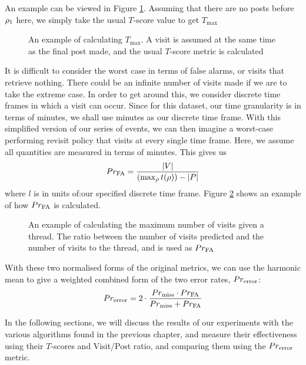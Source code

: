 An example can be viewed in Figure \ref{fig:norm_t_score}. Assuming that there 
are no posts before $\post_1$ here, we simply take the usual $T$-score value to 
get $T_\text{max}$
\begin{figure}
\begin{center}

	\end{center}
\caption{An example of calculating $T_\text{max}$. A visit is assumed at the 
same time as the final post made, and the usual $T$-score metric is 
calculated}\label{fig:norm_t_score}
\end{figure}
It is difficult to consider the worst case in terms of false alarms, or visits 
that retrieve nothing. There could be an infinite number of visits made if we 
are to take the extreme case. In order to get around this, we consider discrete 
time frames in which a visit can occur. Since for this dataset, our time 
granularity is in terms of minutes, we shall use minutes as our discrete time 
frame.
With this simplified version of our series of events, we can then imagine a 
worst-case performing revisit policy that visits at every single time frame.  
Here, we assume all quantities are measured in terms of minutes. This gives us
\[
	\P_{\text{FA}} = \frac{|V|}{(\max_{\post}t(\post)) - |P|}
\]
where $l$ is in units of:our specified discrete time frame. Figure 
\ref{fig:norm_fa_score} shows an example of how $\P_{\text{FA}}$ is calculated.

\begin{figure}
\begin{center}
	
\end{center}
\caption{An example of calculating the maximum number of visits given a thread. 
The ratio between the number of visits predicted and the number of visits to the 
thread, and is used as $\P_{\text{FA}}$}
\label{fig:norm_fa_score}
\end{figure}


With these two normalised forms of the original metrics, we can use the harmonic 
mean to give a weighted combined form of the two error rates, 
$\P_{\text{error}}$:
\[
	\P_{\text{error}} = 2\cdot
	\frac{\P_{\text{miss}} \cdot \P_{\text{FA}}}{%
		\P_{\text{miss}} + \P_{\text{FA}}%
	}
\]


In the following sections, we will discuss the results of our experiments with 
the various algorithms found in the previous chapter, and measure their 
effectiveness using their $T$-scores and Visit/Post ratio, and comparing them 
using the  $\P_{\text{error}}$ metric.

